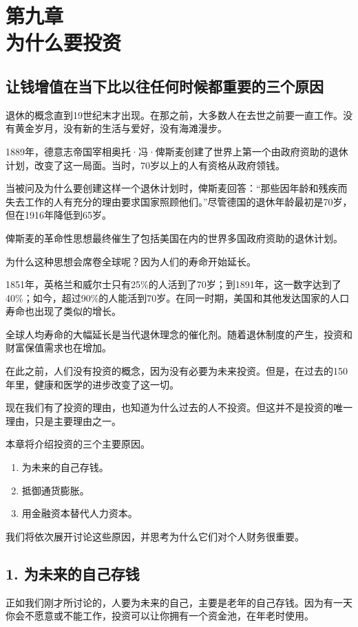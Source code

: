 \section[第九章\q 为什么要投资]{第九章\\ 为什么要投资}
\renewcommand{\bookchapter}{9}
\setcounter{figure}{0}
\setcounter{table}{0}
\subsection{让钱增值在当下比以往任何时候都重要的三个原因}
退休的概念直到19世纪末才出现。在那之前，大多数人在去世之前要一直工作。没有黄金岁月，没有新的生活与爱好，没有海滩漫步。

1889年，德意志帝国宰相奥托·冯·俾斯麦创建了世界上第一个由政府资助的退休计划，改变了这一局面。当时，70岁以上的人有资格从政府领钱。

当被问及为什么要创建这样一个退休计划时，俾斯麦回答：“那些因年龄和残疾而失去工作的人有充分的理由要求国家照顾他们。”尽管德国的退休年龄最初是70岁，但在1916年降低到65岁。

俾斯麦的革命性思想最终催生了包括美国在内的世界多国政府资助的退休计划。

为什么这种思想会席卷全球呢？因为人们的寿命开始延长。

1851年，英格兰和威尔士只有25\%的人活到了70岁；到1891年，这一数字达到了40\%；如今，超过90\%的人能活到70岁。在同一时期，美国和其他发达国家的人口寿命也出现了类似的增长。

全球人均寿命的大幅延长是当代退休理念的催化剂。随着退休制度的产生，投资和财富保值需求也在增加。

在此之前，人们没有投资的概念，因为没有必要为未来投资。但是，在过去的150年里，健康和医学的进步改变了这一切。

现在我们有了投资的理由，也知道为什么过去的人不投资。但这并不是投资的唯一理由，只是主要理由之一。

本章将介绍投资的三个主要原因。

\begin{enumerate}
\item 为未来的自己存钱。
\item 抵御通货膨胀。
\item 用金融资本替代人力资本。
\end{enumerate}
我们将依次展开讨论这些原因，并思考为什么它们对个人财务很重要。

\subsection{1. 为未来的自己存钱}
正如我们刚才所讨论的，人要为未来的自己，主要是老年的自己存钱。因为有一天你会不愿意或不能工作，投资可以让你拥有一个资金池，在年老时使用。

